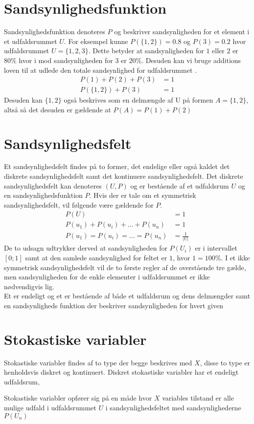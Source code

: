 \documentclass[../../SRP.tex]{subfiles}
\begin{document}
\section{Sandsynlighedsfunktion}

Sandsynlighedsfunktion denoteres $P$ og beskriver sandsynligheden for et element i et udfaldsrummet $U$. For eksempel kunne $P(\{1,2\}) = 0.8$ og $P(3) = 0.2$ hvor udfaldsrummet $U = \{1,2,3\}$. Dette betyder at sandsynligheden for $1$ eller $2$ er $80\%$ hvor i mod sandsynligheden for $3$ er $20\%$. Desuden kan vi bruge additions loven til at udlede den totale sandsynlighed for udfaldsrummet \cite{SC}.
\begin{align}
  P(1) + P(2) + P(3) &= 1 \\
  P(\{1,2\}) + P(3) &= 1
\end{align}
Desuden kan $\{1,2\}$ også beskrives som en delmængde af U på formen $A = \{1,2\}$, altså så det desuden er gældende at $P(A) = P(1) + P(2)$

\section{Sandsynlighedsfelt}

Et sandsynlighedsfelt findes på to former, det endelige eller også kaldet det diskrete sandsynlighedsfelt samt det kontinuere sandsynlighedsfelt. Det diskrete sandsynlighedsfelt kan denoteres $(U, P)$ og er bestående af et udfaldsrum $U$ og en sandsynlighedsfunktion $P$. Hvis der er tale om et symmetrisk sandsynlighedsfelt, vil følgende være gældende for $P$.
\begin{align}
  P(U) &= 1 \\
  P(u_1) + P(u_i) + ... + P(u_n) &= 1 \\
  P(u_1) = P(u_i) = ... = P(u_n) &= \frac{1}{|U|}
\end{align}
De to udsagn udtrykker derved at sandsynligheden for $P(U_i)$ er i intervallet $[0;1]$ samt at den samlede sandsynlighed for feltet er $1$, hvor $1 = 100\%$. I et ikke symmetrisk sandsynlighedsfelt vil de to første regler af de overstående tre gælde, men sandsynligheden for de enkle elementer i udfaldsrummet er ikke nødvendigvis lig. \\

Et er endeligt og et er bestående af både et udfaldsrum og dens delmængder samt en sandsynligheds funktion der beskriver sandsynligheden for hvert given  \cite{SC}

\section{Stokastiske variabler}

Stokastiske variabler findes af to type der begge beskrives med $X$, disse to type er henholdsvis diskret og kontinuert. Diskret stokastiske variabler har et endeligt udfaldsrum,

Stokastiske variabler opfører sig på en måde hvor $X$ variables tilstand er alle mulige udfald i udfaldsrummet $U$ i sandsynlighedsfeltet med sandsynlighederne $P(U_n)$
\end{document}
